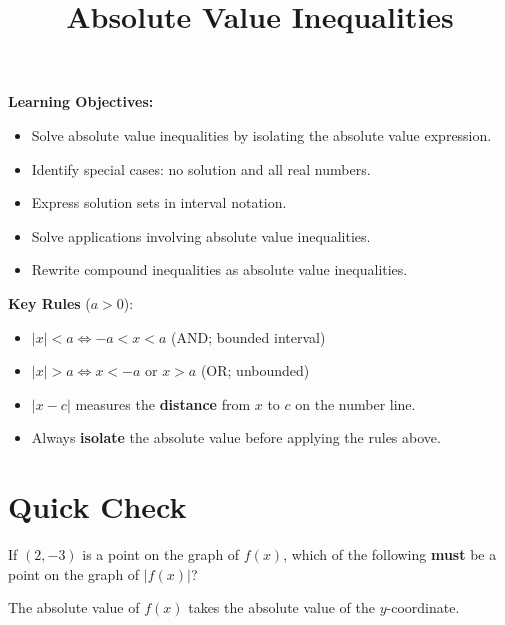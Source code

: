 \documentclass{ximera}
\title{Absolute Value Inequalities}
\begin{document}
\begin{abstract}
\end{abstract}
\maketitle

\textbf{Learning Objectives:}
\begin{itemize}
  \item Solve absolute value inequalities by isolating the absolute value expression.
  \item Identify special cases: no solution and all real numbers.
  \item Express solution sets in interval notation.
  \item Solve applications involving absolute value inequalities.
  \item Rewrite compound inequalities as absolute value inequalities.
\end{itemize}
\medskip

\noindent\textbf{Key Rules} ($a>0$):
\begin{itemize}
  \item $|x| < a \Longleftrightarrow -a < x < a$ \quad (AND; bounded interval)
  \item $|x| > a \Longleftrightarrow x < -a \text{ or } x > a$ \quad (OR; unbounded)
  \item $|x-c|$ measures the \textbf{distance} from $x$ to $c$ on the number line.
  \item Always \textbf{isolate} the absolute value before applying the rules above.
\end{itemize}

\bigskip
\section*{Quick Check}

\begin{problem}
If $(2,-3)$ is a point on the graph of $f(x)$, which of the following \textbf{must} be a point on the graph of $|f(x)|$?
\begin{hint}
The absolute value of $f(x)$ takes the absolute value of the $y$-coordinate.
\end{hint}
\begin{multipleChoice}
\end{multipleChoice}
\end{problem}
\end{document}
